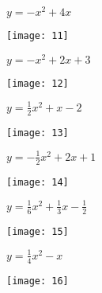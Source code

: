 \documentclass[a4paper]{oblivoir}
\begin{document}
\clearpage
\begin{minipage}{0.45\textwidth}\centering
\(y=-x^2+4x\)
\par\bigskip\texttt{[image: 11]}
\end{minipage}
\begin{minipage}{0.45\textwidth}\centering
\(y=-x^2+2x+3\)
\par\bigskip\texttt{[image: 12]}
\end{minipage}\bigskip\bigskip\par
\begin{minipage}{0.45\textwidth}\centering
\(y=\frac12x^2+x-2\)
\par\bigskip\texttt{[image: 13]}
\end{minipage}
\begin{minipage}{0.45\textwidth}\centering
\(y=-\frac12x^2+2x+1\)
\par\bigskip\texttt{[image: 14]}
\end{minipage}\bigskip\bigskip\par
\begin{minipage}{0.45\textwidth}\centering
\(y=\frac16x^2+\frac13x-\frac12\)
\par\bigskip\texttt{[image: 15]}
\end{minipage}
\begin{minipage}{0.45\textwidth}\centering
\(y=\frac14x^2-x\)
\par\bigskip\texttt{[image: 16]}
\end{minipage}\bigskip\bigskip\par
\end{document}
